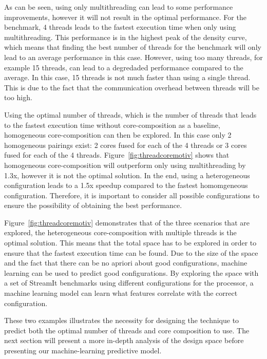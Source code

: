 As can be seen, using only multithreading can lead to some performance improvements, however it will not result in the optimal performance.
For the  benchmark, 4 threads leads to the fastest execution time when only using multithreading.
This performance is in the highest peak of the density curve, which means that finding the best number of threads for the benchmark will only lead to an average performance in this case.
However, using too many threads, for example 15 threads, can lead to a degredaded performance compared to the average.
In this case, 15 threads is not much faster than using a single thread.
This is due to the fact that the communication overhead between threads will be too high.

Using the optimal number of threads, which is the number of threads that leads to the fastest execution time without core-composition as a baseline, homogeneous core-composition can then be explored.
In this case only 2 homogeneous pairings exist: 2 cores fused for each of the 4 threads or 3 cores fused for each of the 4 threads.
Figure~\ref{fig:threadcoremotiv} shows that homogeneous core-composition will outperform only using multithreading by 1.3x, however it is not the optimal solution.
In the end, using a heterogeneous configuration leads to a 1.5x speedup compared to the fastest homomgeneous configuration.
Therefore, it is important to consider all possible configurations to ensure the possibility of obtaining the best performance.

Figure~\ref{fig:threadcoremotiv} demonstrates that of the three scenarios that are explored, the heterogeneous core-composition with multiple threads is the optimal solution.
This means that the total space has to be explored in order to ensure that the fastest execution time can be found.
Due to the size of the space and the fact that there can be no apriori about good configurations, machine learning can be used to predict good configurations.
By exploring the space with a set of StreamIt benchmarks using different configurations for the processor, a machine learning model can learn what features correlate with the correct configuration.

These two examples illustrates the necessity for designing the technique to predict both the optimal number of threads and core composition to use.
The next section will present a more in-depth analysis of the design space before presenting our machine-learning predictive model.


